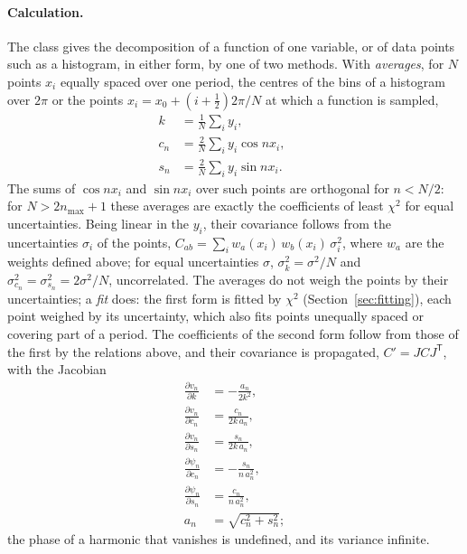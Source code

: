 \paragraph{Calculation.} 

The class 
 gives the decomposition of a function of one variable, or of data points such
as a histogram, in either form, by one of two methods. With \emph{averages}, for $N$ points $x_i$ equally spaced over
one period, the centres of the bins of a histogram over $2\pi$ or the points $x_i = x_0 + (i + \frac{1}{2})2\pi/N$ at
which a function is sampled,
\begin{align}
  k &= \frac{1}{N}\sum_{i} y_i, \qquad  \\
  c_n &= \frac{2}{N}\sum_{i} y_i \cos n x_i, \qquad \\
  s_n &= \frac{2}{N}\sum_{i} y_i \sin n x_i . 
\end{align}
The sums of $\cos n x_i$ and $\sin n x_i$ over such points are orthogonal for $n < N/2$: for $N > 2n_{\max} + 1$ these averages are exactly the coefficients of least $\chi^2$ for equal uncertainties. Being linear in the $y_i$, their covariance follows from the uncertainties $\sigma_i$ of the points, $C_{ab} = \sum_i w_a(x_i)\, w_b(x_i)\,
\sigma_i^2$,  where $w_a$  are the weights defined above; for equal uncertainties $\sigma$, $\sigma_k^2 = \sigma^2/N$ and $\sigma_{c_n}^2 = \sigma_{s_n}^2 = 2\sigma^2/N$, uncorrelated. The averages do not weigh the points by their uncertainties; a \emph{fit} does: the first form is fitted by $\chi^2$ (Section~\ref{sec:fitting}), each point weighed by its uncertainty, which also fits points unequally spaced or covering part of a period. The coefficients of the second form follow from those of the first by the relations above, and their covariance is propagated, $C' = J C J^{\mathsf{T}}$, with the Jacobian
\begin{subequations}
\begin{align}
  \frac{\partial v_n}{\partial k} &= -\frac{a_n}{2k^2}, \quad \\
  \frac{\partial v_n}{\partial c_n} &= \frac{c_n}{2k\,a_n}, \quad \\
  \frac{\partial v_n}{\partial s_n} &= \frac{s_n}{2k\,a_n}, \quad \\
  \frac{\partial \psi_n}{\partial c_n} &= -\frac{s_n}{n\, a_n^2}, \quad \\
  \frac{\partial \psi_n}{\partial s_n} &= \frac{c_n}{n\, a_n^2}, \qquad \\
  a_n &= \sqrt{c_n^2 + s_n^2};
\end{align}
\end{subequations}
the phase of a harmonic that vanishes is undefined, and its variance infinite.

